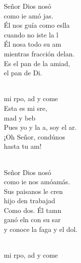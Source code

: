 \begin{cancion}%
	 Señor Dios nosó\\
	como ie amó jas. \\
	Él nos guía como eslla\\
	cuando no iste la l\\
	Él nosa todo su am\\
	mientras fracción delan.\\
	Es el pan de la amiad,\\
	el pan de Di.   \\\jump\\
	\begin{chorus}%
	 mi rpo, ad y come\\
	Esta es mi sre,\\
	mad y beb\\
	Pues yo y la a, soy el ar.\\
	¡Oh Señor, condúnos \\
	hasta tu am!   \\
	\end{chorus}%
	\jump\\
	 Señor Dios nosó\\
	como ie nos amóamás.\\
	Sus paisanos le cren\\
	hijo den trabajad\\
	Como dos. Él tamn \\
	ganó eln con su sar\\
	y conoce la faga y el dol. \\\jump\\
	\begin{chorus}%
	 mi rpo, ad y come\\

\end{chorus}
\end{cancion}
